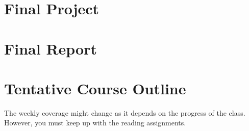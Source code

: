 \documentclass[11pt]{article}
\begin{document}
\section{Final Project}

\section{Final Report}

\newpage

\section{Tentative Course Outline}


The weekly coverage might change as it depends on the progress of the class.  However, you must keep up with the reading assignments.
\end{document}
